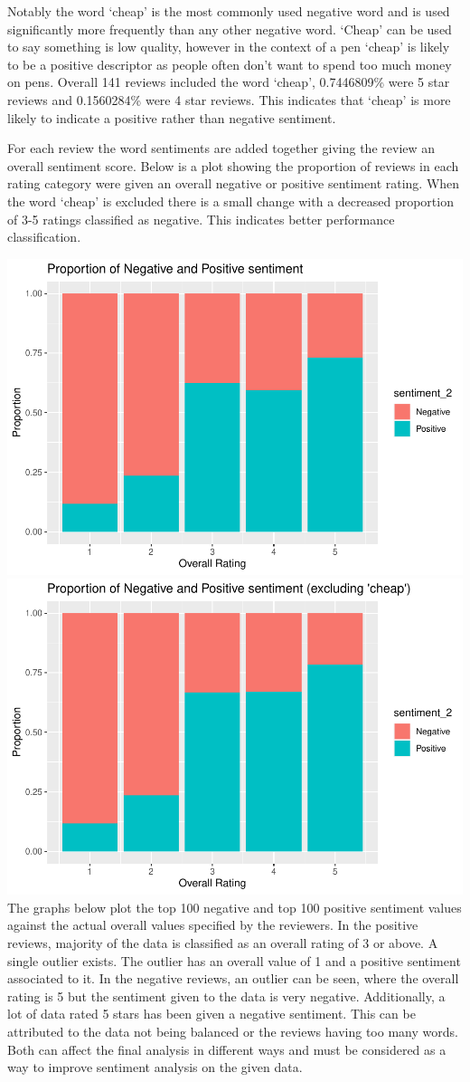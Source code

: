 \documentclass[
  11pt,
]{article}
\begin{document}
Notably the word `cheap' is the most commonly used negative word and is
used significantly more frequently than any other negative word. `Cheap'
can be used to say something is low quality, however in the context of a
pen `cheap' is likely to be a positive descriptor as people often don't
want to spend too much money on pens. Overall 141 reviews included the
word `cheap', 0.7446809\% were 5 star reviews and 0.1560284\% were 4
star reviews. This indicates that `cheap' is more likely to indicate a
positive rather than negative sentiment.

For each review the word sentiments are added together giving the review
an overall sentiment score. Below is a plot showing the proportion of
reviews in each rating category were given an overall negative or
positive sentiment rating. When the word `cheap' is excluded there is a
small change with a decreased proportion of 3-5 ratings classified as
negative. This indicates better performance classification.

\includegraphics[width=0.5\linewidth]{Assignment-STAT702---final_files/figure-latex/3b comparison,figures-side-1}
\includegraphics[width=0.5\linewidth]{Assignment-STAT702---final_files/figure-latex/3b comparison,figures-side-2}
The graphs below plot the top 100 negative and top 100 positive
sentiment values against the actual overall values specified by the
reviewers. In the positive reviews, majority of the data is classified
as an overall rating of 3 or above. A single outlier exists. The outlier
has an overall value of 1 and a positive sentiment associated to it. In
the negative reviews, an outlier can be seen, where the overall rating
is 5 but the sentiment given to the data is very negative. Additionally,
a lot of data rated 5 stars has been given a negative sentiment. This
can be attributed to the data not being balanced or the reviews having
too many words. Both can affect the final analysis in different ways and
must be considered as a way to improve sentiment analysis on the given
data.
\end{document}
